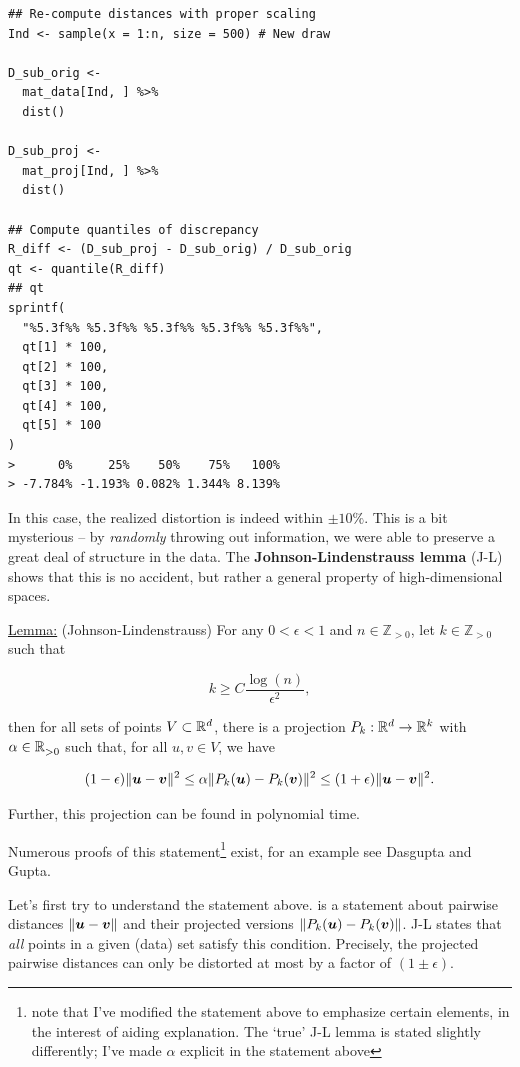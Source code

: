 \documentclass{article}
\begin{document}
\begin{lstlisting}
## Re-compute distances with proper scaling
Ind <- sample(x = 1:n, size = 500) # New draw

D_sub_orig <-
  mat_data[Ind, ] %>%
  dist()

D_sub_proj <-
  mat_proj[Ind, ] %>%
  dist()

## Compute quantiles of discrepancy
R_diff <- (D_sub_proj - D_sub_orig) / D_sub_orig
qt <- quantile(R_diff)
## qt
sprintf(
  "%5.3f%% %5.3f%% %5.3f%% %5.3f%% %5.3f%%",
  qt[1] * 100,
  qt[2] * 100,
  qt[3] * 100,
  qt[4] * 100,
  qt[5] * 100
)
>      0%     25%    50%    75%   100%
> -7.784% -1.193% 0.082% 1.344% 8.139%
\end{lstlisting}

In this case, the realized distortion is indeed within $\pm10\%$. This is a bit
mysterious -- by \emph{randomly} throwing out information, we were able to
preserve a great deal of structure in the data. The
\textbf{Johnson-Lindenstrauss lemma} (J-L) shows that this is no accident, but
rather a general property of high-dimensional spaces.

\bigskip
\underline{Lemma:} (Johnson-Lindenstrauss) For any $0<\epsilon<1$ and
$n\in\mathbb{Z}_{>0}$, let $k\in\mathbb{Z}_{>0}$ such that

\begin{equation} \label{eq:jl-bound}
  k \geq C \frac{\log(n)}{\epsilon^2},
\end{equation}

\noindent then for all sets of points $V\subset\mathbb{R}^{d}$, there is a projection
$P_k:\mathbb{R}^{d}\to\mathbb{R}^{k}$ with $\alpha\in\mathbb{R}^{}_{>0}$ such that, for all $u,v\in V$, we
have

\begin{equation} \label{eq:jl-distance}
  (1 - \epsilon)\|\vu - \vv\|^2 \leq \alpha\|P_k(\vu) - P_k(\vv)\|^2 \leq %
  (1 + \epsilon)\|\vu - \vv\|^2.
\end{equation}

\noindent Further, this projection can be found in polynomial time.

\bigskip
Numerous proofs of this statement\footnote{note that I've modified the statement
  above to emphasize certain elements, in the interest of aiding explanation.
  The `true' J-L lemma is stated slightly differently; I've made $\alpha$
  explicit in the statement above} exist, for an example see Dasgupta and
Gupta.\cite{dasgupta2003elementary}

Let's first try to understand the statement above.  is a
statement about pairwise distances $\|\boldsymbol{u}-\boldsymbol{v}\|$ and their projected versions
$\|P_k(\boldsymbol{u}) - P_k(\boldsymbol{v})\|$. J-L states that \emph{all} points in a given (data)
set satisfy this condition. Precisely, the projected pairwise distances can only
be distorted at most by a factor of $(1\pm\epsilon)$.
\end{document}
